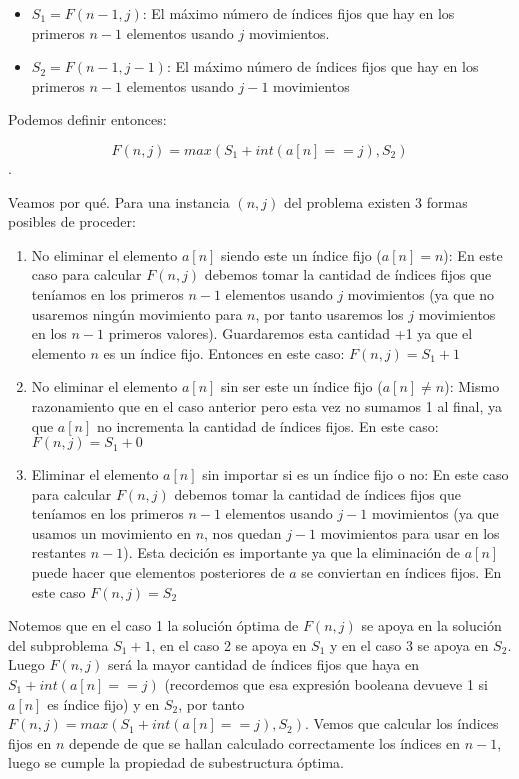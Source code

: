 \documentclass[11pt]{article}
\begin{document}
    \begin{itemize}
        \item $S_1 = F(n-1, j)$: El máximo número de índices fijos que hay en los primeros $n-1$ elementos
              usando $j$ movimientos.
        \item $S_2 = F(n-1, j-1)$: El máximo número de índices fijos que hay en los primeros $n-1$ elementos
              usando $j-1$ movimientos
    \end{itemize}

    Podemos definir entonces:

    \[
    F(n, j) = max(S_1 + int(a[n] == j), S_2)
    \]. 
    
    Veamos por qué. Para una instancia $(n, j)$ del problema existen 3 formas posibles de proceder:

    \begin{enumerate}
        \item No eliminar el elemento $a[n]$ siendo este un índice fijo ($a[n] = n$): En este caso para calcular
              $F(n, j)$ debemos tomar la cantidad de índices fijos que teníamos en los primeros $n-1$ elementos 
               usando $j$ movimientos (ya que no usaremos ningún movimiento para $n$, por tanto usaremos los $j$ 
               movimientos en los $n-1$ primeros valores). Guardaremos esta cantidad +1 ya que el elemento $n$ es 
               un índice fijo. Entonces en este caso: $F(n, j) = S_1 + 1$
        \item No eliminar el elemento $a[n]$ sin ser este un índice fijo ($a[n] \ne n$): Mismo razonamiento que en el caso
              anterior pero esta vez no sumamos 1 al final, ya que $a[n]$ no incrementa la cantidad de índices fijos.
              En este caso: $F(n, j) = S_1 + 0$
        \item Eliminar el elemento $a[n]$ sin importar si es un índice fijo o no: En este caso para calcular
              $F(n, j)$ debemos tomar la cantidad de índices fijos que teníamos en los primeros $n-1$ elementos
              usando $j-1$ movimientos (ya que usamos un movimiento en $n$, nos quedan $j-1$ movimientos para
              usar en los restantes $n-1$). Esta decición es importante ya que la eliminación de $a[n]$ puede hacer
              que elementos posteriores de $a$ se conviertan en índices fijos. En este caso $F(n, j) = S_2$
    \end{enumerate}

    Notemos que en el caso 1 la solución óptima de $F(n, j)$ se apoya en la solución del subproblema $S_1 + 1$, en el
    caso 2 se apoya en $S_1$ y en el caso 3 se apoya en $S_2$. Luego $F(n, j)$ será la mayor cantidad de índices fijos
    que haya en $S_1 + int(a[n] == j)$ (recordemos que esa expresión booleana devueve 1 si $a[n]$ es índice fijo) y en 
    $S_2$, por tanto $F(n, j) = max(S_1 + int(a[n] == j), S_2)$. Vemos que calcular los índices fijos en $n$ depende de
    que se hallan calculado correctamente los índices en $n-1$, luego se cumple la propiedad de subestructura óptima.
    
\end{document}
